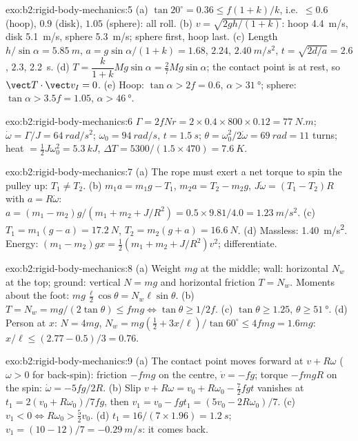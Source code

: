 \begin{solution}{exo:b2:rigid-body-mechanics:5}
(a) $\tan20^\circ = 0.36 \le f(1 + k)/k$, i.e.\ $\le 0.6$ (hoop), $0.9$
(disk), $1.05$ (sphere): all roll. (b) $v = \sqrt{2gh/(1 + k)}$: hoop
\qty{4.4}{m/s}, disk \qty{5.1}{m/s}, sphere \qty{5.3}{m/s}; sphere first, hoop
last. (c) Length $h/\sin\alpha = \qty{5.85}{m}$, $a = g\sin\alpha/(1 + k) =
1.68$, $2.24$, $\qty{2.40}{m/s^2}$, $t = \sqrt{2d/a} = 2.6$, $2.3$, \qty{2.2}{s}.
(d) $T = \dfrac{k}{1 + k}Mg\sin\alpha = \tfrac27Mg\sin\alpha$; the contact
point is at rest, so $\vect T\cdot\vect v_I = 0$. (e) Hoop: $\tan\alpha >
2f = 0.6$, $\alpha > \qty{31}{\degree}$; sphere: $\tan\alpha > 3.5f = 1.05$,
$\alpha > \qty{46}{\degree}$.
\end{solution}

\begin{solution}{exo:b2:rigid-body-mechanics:6}
$\Gamma = 2fNr = 2 \times 0.4 \times 800 \times 0.12 = \qty{77}{N.m}$; $\dot\omega =
\Gamma/J = \qty{64}{rad/s^2}$; $\omega_0 = \qty{94}{rad/s}$, $t = \qty{1.5}{s}$;
$\theta = \omega_0^2/2\dot\omega = \qty{69}{rad} = 11$ turns; heat $= \tfrac12J
\omega_0^2 = \qty{5.3}{kJ}$, $\Delta T = 5300/(1.5 \times 470) = \qty{7.6}{K}$.
\end{solution}

\begin{solution}{exo:b2:rigid-body-mechanics:7}
(a) The rope must exert a net torque to spin the pulley up: $T_1 \ne T_2$.
(b) $m_1a = m_1g - T_1$, $m_2a = T_2 - m_2g$, $J\dot\omega = (T_1 - T_2)R$ with
$a = R\dot\omega$: $a = (m_1 - m_2)g/(m_1 + m_2 + J/R^2) = 0.5 \times 9.81/4.0 =
\qty{1.23}{m/s^2}$. (c) $T_1 = m_1(g - a) = \qty{17.2}{N}$, $T_2 = m_2(g + a) =
\qty{16.6}{N}$. (d) Massless: \qty{1.40}{m/s^2}. Energy: $(m_1 - m_2)gx =
\tfrac12(m_1 + m_2 + J/R^2)v^2$; differentiate.
\end{solution}

\begin{solution}{exo:b2:rigid-body-mechanics:8}
(a) Weight $mg$ at the middle; wall: horizontal $N_w$ at the top; ground:
vertical $N = mg$ and horizontal friction $T = N_w$. Moments about the
foot: $mg\,\tfrac{\ell}2\cos\theta = N_w\ell\sin\theta$. (b) $T = N_w =
mg/(2\tan\theta) \le fmg \iff \tan\theta \ge 1/2f$. (c) $\tan\theta \ge
1.25$, $\theta \ge \qty{51}{\degree}$. (d) Person at $x$: $N = 4mg$, $N_w =
mg(\tfrac12 + 3x/\ell)/\tan60^\circ \le 4fmg = 1.6mg$: $x/\ell \le (2.77 -
0.5)/3 = 0.76$.
\end{solution}

\begin{solution}{exo:b2:rigid-body-mechanics:9}
(a) The contact point moves forward at $v + R\omega$ ($\omega > 0$ for
back-spin): friction $-fmg$ on the centre, $\dot v = -fg$; torque
$-fmgR$ on the spin: $\dot\omega = -5fg/2R$. (b) Slip $v + R\omega = v_0 +
R\omega_0 - \tfrac72fgt$ vanishes at $t_1 = 2(v_0 + R\omega_0)/7fg$, then $v_1
= v_0 - fgt_1 = (5v_0 - 2R\omega_0)/7$. (c) $v_1 < 0 \iff R\omega_0 > \tfrac52v_0$.
(d) $t_1 = 16/(7 \times 1.96) = \qty{1.2}{s}$; $v_1 = (10 - 12)/7 = \qty{-0.29}{m/s}$:
it comes back.
\end{solution}

